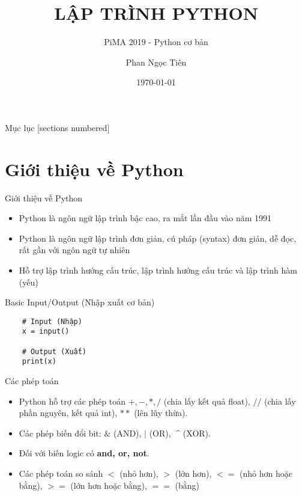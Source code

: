 \documentclass[10pt]{beamer}
\title{LẬP TRÌNH PYTHON}
\subtitle{PiMA 2019 - Python cơ bản}
\date{\today}
\date{}
\author{Phan Ngọc Tiên}
\institute{York University, Toronto, Canada}
\begin{document}
\maketitle

\begin{frame}{Mục lục}
  [sections numbered]
  \tableofcontents[hideallsubsections]
\end{frame}

\section{Giới thiệu về Python}
\begin{frame}{Giới thiệu về Python}
  \begin{itemize}
    \item Python là ngôn ngữ lập trình bậc cao, ra mắt lần đầu vào năm 1991
    \item Python là ngôn ngữ lập trình đơn giản, cú pháp (syntax) đơn giản, dễ  đọc, rất gần với ngôn ngữ tự nhiên
    \item Hỗ trợ lập trình hướng cấu trúc, lập trình hướng cấu trúc và lập trình hàm (yếu)
  \end{itemize}
\end{frame}

\begin{frame}[fragile]{Basic Input/Output (Nhập xuất cơ bản)}
  \begin{verbatim}
    # Input (Nhập)
    x = input()

    # Output (Xuất)
    print(x)
  \end{verbatim}
\end{frame}

\begin{frame}[fragile]{Các phép toán}
  \begin{itemize}
    \item Python hỗ trợ các phép toán $+, -, *, /$ (chia lấy kết quả float), $//$ (chia lấy phần nguyên, kết quả int), $**$ (lên lũy thừa).

    \item Các phép biến đổi bit: $\&$ (AND), $|$ (OR), $\ \^$ (XOR).

    \item Đối với biến logic có \textbf{and, or, not}.

    \item Các phép toán so sánh $<$ (nhỏ hơn), $>$ (lớn hơn), $<=$ (nhỏ hơn hoặc bằng), $>=$ (lớn hơn hoặc bằng), $==$ (bằng)

  \end{itemize}
\end{frame}
\end{document}
